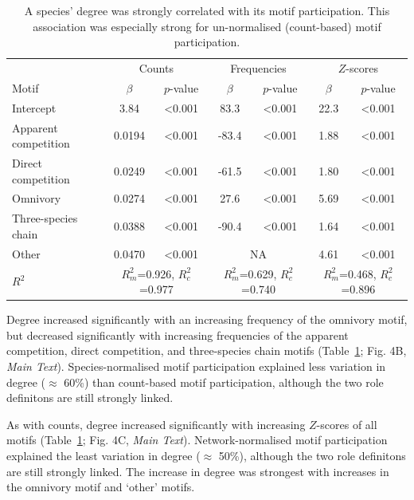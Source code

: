 \documentclass[12pt]{article}
\begin{document}
\begin{spacing}{2.0}
			\begin{table}[hb!]
    			\caption{A species' degree was strongly correlated with its motif participation. This association was especially strong for un-normalised (count-based) motif participation.}
    			\label{tab:motifs_vs_deg}
    			\begin{tabular}{l | c c | c c | c c}
    			& \multicolumn{2}{c|}{Counts} & \multicolumn{2}{c}{Frequencies} & \multicolumn{2}{|c}{$Z$-scores} \\
    			Motif & $\beta$ & $p$-value & $\beta$ & $p$-value & $\beta$ & $p$-value \\
    			\hline
    			Intercept &  3.84  & \textless0.001 & 83.3 & \textless0.001 & 22.3 & \textless0.001\\
    			\hline
    			Apparent competition       &  0.0194  & \textless0.001 & -83.4 & \textless0.001 & 1.88 & \textless0.001 \\
    			Direct competition       &  0.0249  & \textless0.001 & -61.5 & \textless0.001 & 1.80 & \textless0.001\\
    			Omnivory       &  0.0274  & \textless0.001 & 27.6 & \textless0.001 & 5.69 & \textless0.001\\
    			Three-species chain       &  0.0388  & \textless0.001 & -90.4 & \textless0.001 & 1.64 & \textless0.001\\
    			Other    &  0.0470  & \textless0.001 & \multicolumn{2}{c|}{NA} & 4.61 & \textless0.001 \\
    			\hline
    			$R^2$ & \multicolumn{2}{c|}{\tiny{$R^2_m$=0.926, $R^2_c$=0.977}} & \multicolumn{2}{c}{\tiny{$R^2_m$=0.629, $R^2_c$=0.740}} & \multicolumn{2}{|c}{\tiny{$R^2_m$=0.468, $R^2_c$=0.896}} \\
    			\end{tabular}
    			\end{table}


			Degree increased significantly with an increasing frequency of the omnivory motif, but decreased significantly with increasing frequencies of the apparent competition, direct competition, and three-species chain motifs (Table~\ref{tab:motifs_vs_deg}; Fig. 4B, \emph{Main Text}).
			Species-normalised motif participation explained less variation in degree ($\approx$ 60\%) than count-based motif participation, although the two role definitons are still strongly linked.


			As with counts, degree increased significantly with increasing $Z$-scores of all motifs (Table~\ref{tab:motifs_vs_deg}; Fig. 4C, \emph{Main Text}).
			Network-normalised motif participation explained the least variation in degree ($\approx$ 50\%), although the two role definitons are still strongly linked.
			The increase in degree was strongest with increases in the omnivory motif and `other' motifs.



\end{spacing}
\end{document}
